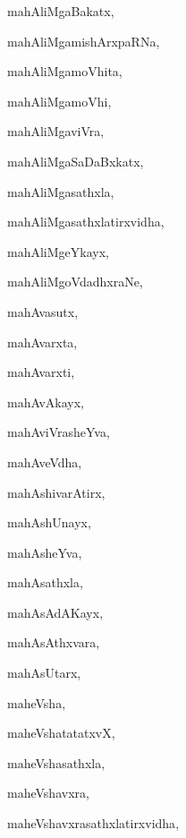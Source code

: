 \begin{multicols}{3}
{\noindent
{mahAliMgaBakatx}, \pageref{mahAliMgaBakatx}

\noindent
{mahAliMgamishArxpaRNa}, \pageref{mahAliMgamishArxpaRNa}

\noindent
{mahAliMgamoVhita}, \pageref{mahAliMgamoVhita}

\noindent
{mahAliMgamoVhi}, \pageref{mahAliMgamoVhi}

\noindent
{mahAliMgaviVra}, \pageref{mahAliMgaviVra}

\noindent
{mahAliMgaSaDaBxkatx}, \pageref{mahAliMgaSaDaBxkatx}

\noindent
{mahAliMgasathxla}, \pageref{mahAliMgasathxla}

\noindent
{mahAliMgasathxlatirxvidha}, \pageref{mahAliMgasathxlatirxvidha}

\noindent
{mahAliMgeYkayx}, \pageref{mahAliMgeYkayx}

\noindent
{mahAliMgoVdadhxraNe}, \pageref{mahAliMgoVdadhxraNe}

\noindent
{mahAvasutx}, \pageref{mahAvasutx}

\noindent
{mahAvarxta}, \pageref{mahAvarxta}

\noindent
{mahAvarxti}, \pageref{mahAvarxti}

\noindent
{mahAvAkayx}, \pageref{mahAvAkayx}

\noindent
{mahAviVrasheYva}, \pageref{mahAviVrasheYva}

\noindent
{mahAveVdha}, \pageref{mahAveVdha}

\noindent
{mahAshivarAtirx}, \pageref{mahAshivarAtirx}

\noindent
{mahAshUnayx}, \pageref{mahAshUnayx}

\noindent
{mahAsheYva}, \pageref{mahAsheYva}

\noindent
{mahAsathxla}, \pageref{mahAsathxla}

\noindent
{mahAsAdAKayx}, \pageref{mahAsAdAKayx}

\noindent
{mahAsAthxvara}, \pageref{mahAsAthxvara}

\noindent
{mahAsUtarx}, \pageref{mahAsUtarx}

\noindent
{maheVsha}, \pageref{maheVsha}

\noindent
{maheVshatatatxvX}, \pageref{maheVshatatatxvX}

\noindent
{maheVshasathxla}, \pageref{maheVshasathxla}

\noindent
{maheVshavxra}, \pageref{maheVshavxra}

\noindent
{maheVshavxrasathxlatirxvidha}, \pageref{maheVshavxrasathxlatirxvidha}

}
\end{multicols}

